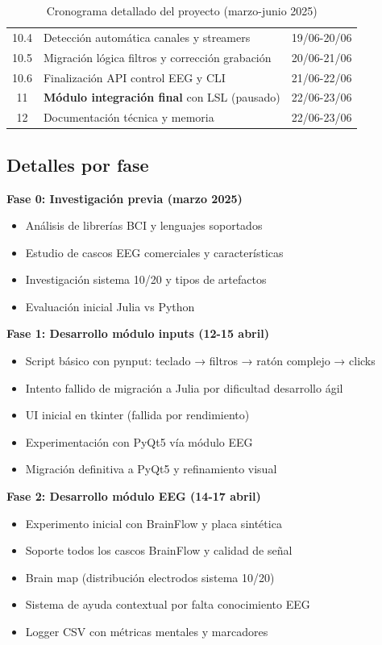\begin{table}[hp!]
{\begin{tabular}{c|l|c}
    10.4 & Detección automática canales y streamers & 19/06-20/06 \\
    10.5 & Migración lógica filtros y corrección grabación & 20/06-21/06 \\
    10.6 & Finalización API control EEG y CLI & 21/06-22/06 \\
    11 & \textbf{Módulo integración final} con LSL (pausado) & 22/06-23/06 \\
    12 & Documentación técnica y memoria & 22/06-23/06 \\
    \end{tabular}
  }
  \caption{Cronograma detallado del proyecto (marzo-junio 2025)}
  \label{tab:cronograma}
\end{table}

\subsection{Detalles por fase}

\textbf{Fase 0: Investigación previa (marzo 2025)}
\begin{itemize}
    \item Análisis de librerías BCI y lenguajes soportados
    \item Estudio de cascos EEG comerciales y características
    \item Investigación sistema 10/20 y tipos de artefactos
    \item Evaluación inicial Julia vs Python
\end{itemize}

\textbf{Fase 1: Desarrollo módulo inputs (12-15 abril)}
\begin{itemize}
    \item Script básico con pynput: teclado → filtros → ratón complejo → clicks
    \item Intento fallido de migración a Julia por dificultad desarrollo ágil
    \item UI inicial en tkinter (fallida por rendimiento)
    \item Experimentación con PyQt5 vía módulo EEG
    \item Migración definitiva a PyQt5 y refinamiento visual
\end{itemize}

\textbf{Fase 2: Desarrollo módulo EEG (14-17 abril)}
\begin{itemize}
    \item Experimento inicial con BrainFlow y placa sintética
    \item Soporte todos los cascos BrainFlow y calidad de señal
    \item Brain map (distribución electrodos sistema 10/20)
    \item Sistema de ayuda contextual por falta conocimiento EEG
    \item Logger CSV con métricas mentales y marcadores
\end{itemize}

